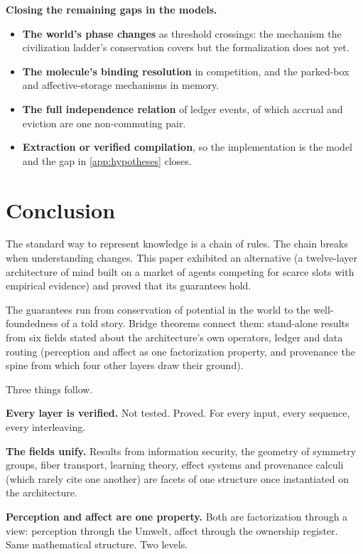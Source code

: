 \documentclass[11pt]{article}
\theoremstyle{remark}
\begin{document}
\textbf{Closing the remaining gaps in the models.}
\begin{itemize}[nosep]
    \item \textbf{The world's phase changes} as threshold crossings: the mechanism the
    civilization ladder's conservation covers but the formalization does not yet.
    \item \textbf{The molecule's binding resolution} in competition, and the parked-box and
    affective-storage mechanisms in memory.
    \item \textbf{The full independence relation} of ledger events, of which accrual and
    eviction are one non-commuting pair.
    \item \textbf{Extraction or verified compilation}, so the implementation is the model
    and the gap in \cref{app:hypotheses} closes.
\end{itemize}

\section{Conclusion}
\label{sec:conclusion}

The standard way to represent knowledge is a chain of rules. The chain breaks when
understanding changes. This paper exhibited an alternative (a twelve-layer architecture
of mind built on a market of agents competing for scarce slots with empirical evidence)
and proved that its guarantees hold.

The guarantees run from conservation of potential in the world to the well-foundedness of
a told story. Bridge theorems connect them: stand-alone results from six fields stated
about the architecture's own operators, ledger and data routing (perception and affect as
one factorization property, and provenance the spine from which four other layers draw
their ground).

Three things follow.

\textbf{Every layer is verified.} Not tested. Proved. For every input, every sequence,
every interleaving.

\textbf{The fields unify.} Results from information security, the geometry of symmetry
groups, fiber transport, learning theory, effect systems and provenance calculi (which
rarely cite one another) are facets of one structure once instantiated on the architecture.

\textbf{Perception and affect are one property.} Both are factorization through a view:
perception through the Umwelt, affect through the ownership register. Same mathematical
structure. Two levels.
\end{document}
